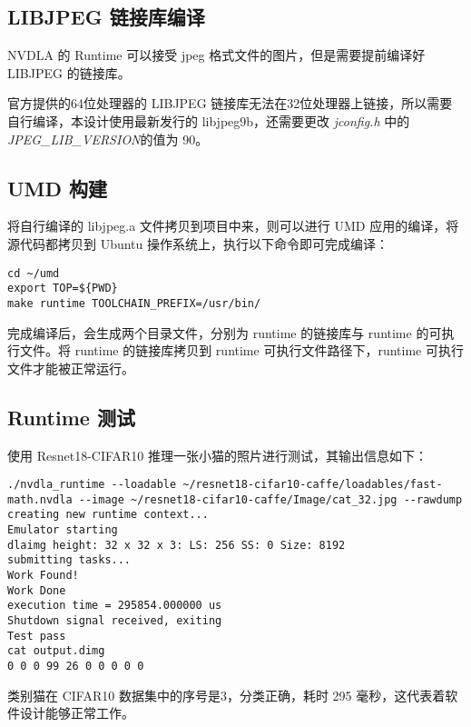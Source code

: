 \subsection{LIBJPEG 链接库编译}

NVDLA 的 Runtime 可以接受 jpeg 格式文件的图片，但是需要提前编译好 LIBJPEG 的链接库。

官方提供的64位处理器的 LIBJPEG 链接库无法在32位处理器上链接，所以需要自行编译，本设计使用最新发行的 libjpeg9b，还需要更改 \emph{jconfig.h} 中的 \emph{JPEG\_LIB\_VERSION}的值为 90。

\subsection{UMD 构建}

将自行编译的 libjpeg.a 文件拷贝到项目中来，则可以进行 UMD 应用的编译，将源代码都拷贝到 Ubuntu 操作系统上，执行以下命令即可完成编译：

\begin{lstlisting}
cd ~/umd
export TOP=${PWD}
make runtime TOOLCHAIN_PREFIX=/usr/bin/
\end{lstlisting}

完成编译后，会生成两个目录文件，分别为 runtime 的链接库与 runtime 的可执行文件。将 runtime 的链接库拷贝到 runtime 可执行文件路径下，runtime 可执行文件才能被正常运行。

\subsection{Runtime 测试}

使用 Resnet18-CIFAR10 推理一张小猫的照片进行测试，其输出信息如下：

\begin{lstlisting}
./nvdla_runtime --loadable ~/resnet18-cifar10-caffe/loadables/fast-math.nvdla --image ~/resnet18-cifar10-caffe/Image/cat_32.jpg --rawdump
creating new runtime context...
Emulator starting
dlaimg height: 32 x 32 x 3: LS: 256 SS: 0 Size: 8192
submitting tasks...
Work Found!
Work Done
execution time = 295854.000000 us
Shutdown signal received, exiting
Test pass
cat output.dimg 
0 0 0 99 26 0 0 0 0 0 
\end{lstlisting}

类别猫在 CIFAR10 数据集中的序号是3，分类正确，耗时 295 毫秒，这代表着软件设计能够正常工作。